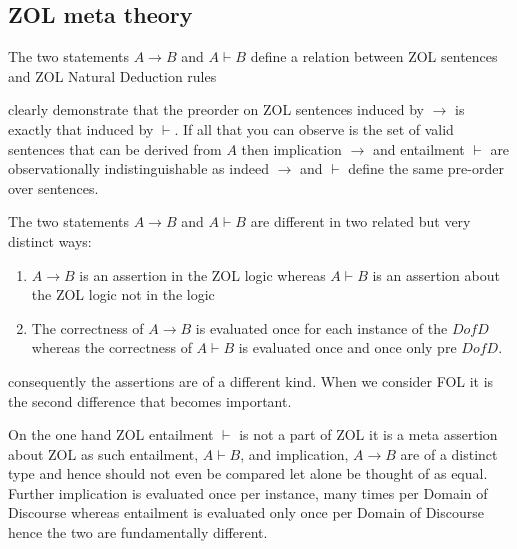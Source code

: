 \subsection{ZOL meta theory}
The two statements  $A\rightarrow B$ and $A\vdash B$  define a relation between ZOL sentences and ZOL  Natural Deduction rules

\hspace{\fill}\begin{minipage}{1in}
\begin{prooftree}
 
\end{prooftree} 
\end{minipage}
\hspace{\fill}
\begin{minipage}{1in}
\begin{prooftree}
 
\end{prooftree} 
\end{minipage}
\hspace{\fill}

clearly demonstrate that the preorder on ZOL sentences induced by $\rightarrow$ is exactly that induced by $\vdash$.
If all that you can observe is the set of valid sentences that can be derived from $A$ then implication $\rightarrow$ and entailment $\vdash$ are observationally indistinguishable as indeed $\rightarrow$ and $\vdash$ define the same pre-order over sentences.  



The two statements  $A\rightarrow B$ and $A\vdash B$ are different in two related but very distinct ways:
\begin{enumerate}
\item $A\rightarrow B$ is an assertion in the ZOL logic
 whereas  $A\vdash B$ is an assertion about the ZOL logic not in the logic
 \item The correctness of $A\rightarrow B$ is evaluated once for each instance of the $DofD$ whereas the correctness of $A\vdash B$ is evaluated once and once only pre $DofD$.
\end{enumerate}
consequently the assertions are of a different kind. When we consider FOL it is the second difference that becomes important.




On the one hand ZOL entailment $\vdash$ is not a part of ZOL it is a meta assertion about ZOL as such entailment, $A\vdash B$, and implication, $A\rightarrow B$ are  of a distinct type and hence should  not even be compared let alone be thought of as equal. Further implication is evaluated once per instance, many times per Domain of Discourse whereas entailment is evaluated only once per Domain of Discourse hence the two are fundamentally  different.

